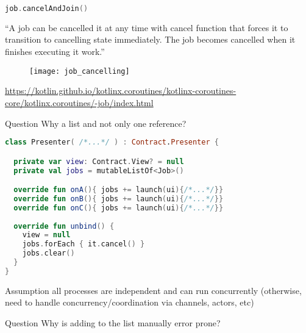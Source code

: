 \documentclass[10pt]{beamer}
\begin{document}
\begin{frame}[fragile]
\begin{lstlisting}[language=Kotlin, basicstyle=\ttfamily]
    job.cancelAndJoin()
\end{lstlisting}
\end{frame}

\begin{frame}
``A job can be cancelled it at any time with cancel function that forces it to transition to cancelling state immediately. The job becomes cancelled when it finishes executing it work.''
\end{frame}

\begin{frame}
	\begin{figure}
		\centering
		\texttt{[image: job\_cancelling]}
	\end{figure}
\url{https://kotlin.github.io/kotlinx.coroutines/kotlinx-coroutines-core/kotlinx.coroutines/-job/index.html}
\end{frame}



\begin{frame}[fragile]
	\begin{alertblock}{Question}
Why a list and not only one reference?
\end{alertblock}
\end{frame}
\begin{frame}[fragile]
\begin{lstlisting}[language=Kotlin, basicstyle=\ttfamily]
class Presenter( /*...*/ ) : Contract.Presenter {

  private var view: Contract.View? = null
  private val jobs = mutableListOf<Job>()

  override fun onA(){ jobs += launch(ui){/*...*/}}
  override fun onB(){ jobs += launch(ui){/*...*/}}
  override fun onC(){ jobs += launch(ui){/*...*/}}
  
  override fun unbind() {
    view = null
    jobs.forEach { it.cancel() } 
    jobs.clear() 
  }
}
\end{lstlisting}
\end{frame}

\begin{frame}[fragile]
	\begin{alertblock}{Assumption}
all processes are independent and can run concurrently (otherwise, need to handle concurrency/coordination via channels, actors, etc) 
\end{alertblock}
\end{frame}
\begin{frame}[fragile]
	\begin{alertblock}{Question}
Why is adding to the list manually error prone?
\end{alertblock}
\end{frame}
\end{document}
